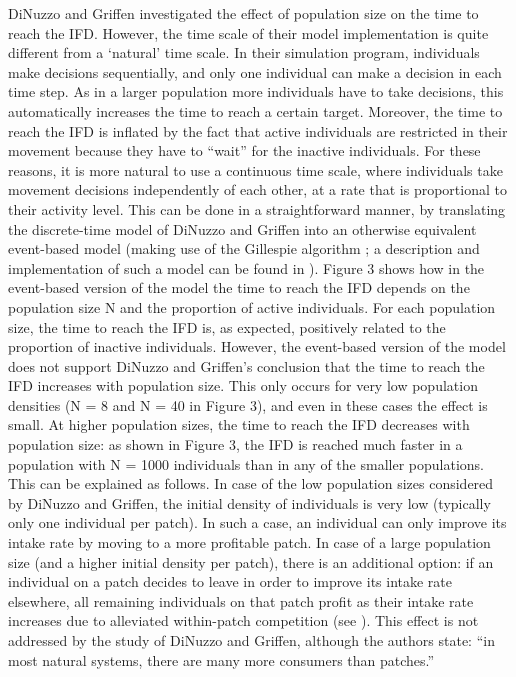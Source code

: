 \begin{refsection}
	DiNuzzo and Griffen investigated the effect of population size on the time to reach the IFD.
	However, the time scale of their model implementation is quite different from a `natural' time scale.
	In their simulation program, individuals make decisions sequentially, and only one individual can make a decision in each time step.
	As in a larger population more individuals have to take decisions, this automatically increases the time to reach a certain target.
	Moreover, the time to reach the IFD is inflated by the fact that active individuals are restricted in their movement because they have to ``wait'' for the inactive individuals.
	For these reasons, it is more natural to use a continuous time scale, where individuals take movement decisions independently of each other, at a rate that is proportional to their activity level.
	This can be done in a straightforward manner, by translating the discrete-time model of DiNuzzo and Griffen into an otherwise equivalent event-based model (making use of the Gillespie algorithm \cite{gillespie1976}; a description and implementation of such a model can be found in \cite{netz2021b}).
	Figure 3 shows how in the event-based version of the model the time to reach the IFD depends on the population size N and the proportion of active individuals.
	For each population size, the time to reach the IFD is, as expected, positively related to the proportion of inactive individuals.
	However, the event-based version of the model does not support DiNuzzo and Griffen's conclusion that the time to reach the IFD increases with population size.
	This only occurs for very low population densities (N = 8 and N = 40 in Figure 3), and even in these cases the effect is small.
	At higher population sizes, the time to reach the IFD decreases with population size: as shown in Figure 3, the IFD is reached much faster in a population with N = 1000 individuals than in any of the smaller populations.
	This can be explained as follows.
	In case of the low population sizes considered by DiNuzzo and Griffen, the initial density of individuals is very low (typically only one individual per patch).
	In such a case, an individual can only improve its intake rate by moving to a more profitable patch.
	In case of a large population size (and a higher initial density per patch), there is an additional option: if an individual on a patch decides to leave in order to improve its intake rate elsewhere, all remaining individuals on that patch profit as their intake rate increases due to alleviated within-patch competition (see \citep{wolf2008a}).
	This effect is not addressed by the study of DiNuzzo and Griffen, although the authors state: ``in most natural systems, there are many more consumers than patches.'' 


\end{refsection}
